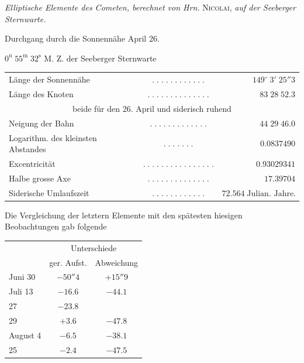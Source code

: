 \begin{center}
\emph{Elliptische Elemente des Cometen, berechnet von Hrn.} \textsc{Nicolai}, \emph{auf der Seeberger Sternwarte.}
\end{center}

\begin{center}\fontsize{10}{12}\selectfont Durchgang durch die Sonnennähe April 26.\par $0^{\mathrm u}\;55^{\mathrm m}\;32^{\mathrm s}$ M. Z. der Seeberger Sternwarte\end{center}
\begin{center}\fontsize{9}{11}\selectfont\setlength{\tabcolsep}{2pt}\renewcommand{\arraystretch}{1.15}\begin{tabular}{lcr}
Länge der Sonnennähe & $.\;.\;.\;.\;.\;.\;.\;.\;.\;.\;.\;.$ & $149^\circ\;3'\;25''3$\\
Länge des Knoten & $.\;.\;.\;.\;.\;.\;.\;.\;.\;.\;.\;.\;.\;.$ & $83\;28\;52.3$\\
\multicolumn{3}{c}{beide für den 26. April und siderisch ruhend}\\
Neigung der Bahn & $.\;.\;.\;.\;.\;.\;.\;.\;.\;.\;.\;.\;.$ & $44\;29\;46.0$\\
Logarithm. des kleinsten Abstandes & $.\;.\;.\;.\;.\;.\;.$ & $0.0837490$\\
Excentricität & $.\;.\;.\;.\;.\;.\;.\;.\;.\;.\;.\;.\;.\;.\;.\;.$ & $0.93029341$\\
Halbe grosse Axe & $.\;.\;.\;.\;.\;.\;.\;.\;.\;.\;.\;.\;.\;.$ & $17.39704$\\
Siderische Umlaufszeit & $.\;.\;.\;.\;.\;.\;.\;.\;.\;.\;.\;.$ & $72.564\;\text{Julian. Jahre.}$\\
\end{tabular}\end{center}

\begingroup\setlength{\rightskip}{0pt plus 1em}\par\indent Die Vergleichung der letztern Elemente mit den spätesten hiesigen Beobachtungen gab folgende\par\endgroup

\begin{center}
\fontsize{10}{12}\selectfont\setlength{\tabcolsep}{9pt}\renewcommand{\arraystretch}{1.15}\begin{tabular}{l | c | c}
& \multicolumn{2}{c}{Unterschiede} \\
& ger. Aufst. & Abweichung \\
\hline
Juni 30 & $-50''4$ & $+15''9$ \\
Juli 13 & $-16.6$ & $-44.1$ \\
27 & $-23.8$ & \\
29 & $+3.6$ & $-47.8$ \\
August 4 & $-6.5$ & $-38.1$ \\
25 & $-2.4$ & $-47.5$ \\
\end{tabular}
\end{center}

